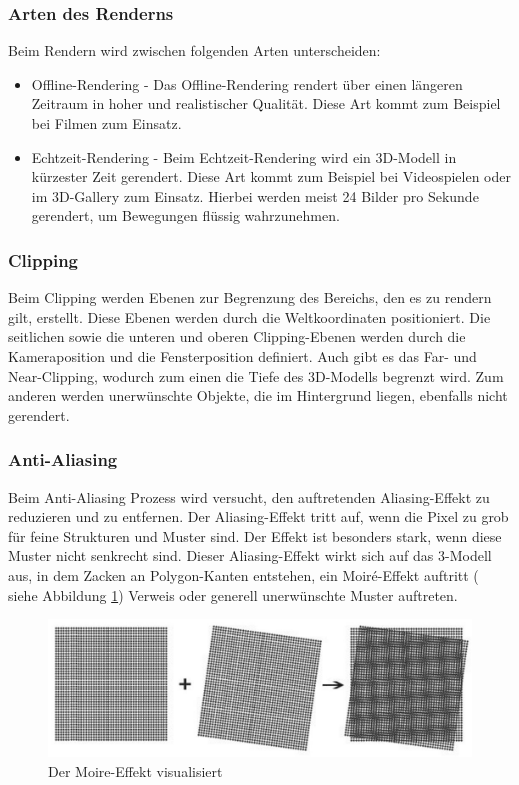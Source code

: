 \subsubsection{Arten des Renderns}
Beim Rendern wird zwischen folgenden Arten unterscheiden:

\begin{itemize}
    \item Offline-Rendering - Das Offline-Rendering rendert über einen längeren Zeitraum in hoher und realistischer Qualität. Diese Art kommt zum Beispiel bei Filmen zum Einsatz. 
    \item Echtzeit-Rendering - Beim Echtzeit-Rendering wird ein 3D-Modell in kürzester Zeit gerendert. Diese Art kommt zum Beispiel bei Videospielen oder im 3D-Gallery zum Einsatz. Hierbei werden meist 24 Bilder pro Sekunde gerendert, um Bewegungen flüssig wahrzunehmen. 
\end{itemize}
\cite{RenderArten}

\subsubsection{Clipping}
\label{clipping}
Beim Clipping werden Ebenen zur Begrenzung des Bereichs, den es zu rendern gilt, erstellt. Diese Ebenen werden durch die Weltkoordinaten positioniert. Die seitlichen sowie die unteren und oberen Clipping-Ebenen werden durch die Kameraposition und die Fensterposition definiert. Auch gibt es das Far- und Near-Clipping, wodurch zum einen die Tiefe des 3D-Modells begrenzt wird. Zum anderen werden unerwünschte Objekte, die im Hintergrund liegen, ebenfalls nicht gerendert. \cite{Rendering3DModels}


\subsubsection{Anti-Aliasing}
Beim Anti-Aliasing Prozess wird versucht, den auftretenden Aliasing-Effekt zu reduzieren und zu entfernen. Der Aliasing-Effekt tritt auf, wenn die Pixel zu grob für feine Strukturen und Muster sind. Der Effekt ist besonders stark, wenn diese Muster nicht senkrecht sind. Dieser Aliasing-Effekt wirkt sich auf das 3-Modell aus, in dem Zacken an Polygon-Kanten entstehen, ein Moiré-Effekt auftritt ( siehe Abbildung \ref{fig:impl:MoireEffekt}) Verweis oder generell unerwünschte Muster auftreten.\cite{Rendering3DModels} 
\begin{figure}
    \centering
    \includegraphics[scale=0.3]{pics/moire-effekt.jpg}
    \caption{Der Moire-Effekt visualisiert \cite{MoireEffekt}}
    \label{fig:impl:MoireEffekt}
\end{figure}

